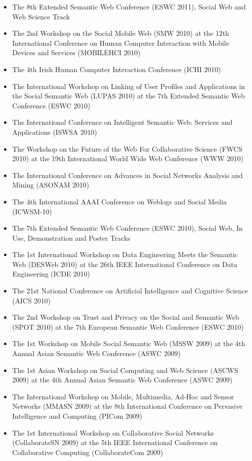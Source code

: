 \documentclass[10pt,a4paper]{res} %
\begin{document}
\begin{resume}
\begin{itemize}
\item The 8th Extended Semantic Web Conference (ESWC 2011), Social Web and Web Science Track
\item The 2nd Workshop on the Social Mobile Web (SMW 2010) at the 12th International Conference on Human Computer Interaction with Mobile Devices and Services (MOBILEHCI 2010)
\item The 4th Irish Human Computer Interaction Conference (ICHI 2010)
\item The International Workshop on Linking of User Profiles and Applications in the Social Semantic Web (LUPAS 2010) at the 7th Extended Semantic Web Conference (ESWC 2010)
\item The International Conference on Intelligent Semantic Web: Services and Applications (ISWSA 2010)
\item The Workshop on the Future of the Web For Collaborative Science (FWCS 2010) at the 19th International World Wide Web Conference (WWW 2010)
\item The International Conference on Advances in Social Networks Analysis and Mining (ASONAM 2010)
\item The 4th International AAAI Conference on Weblogs and Social Media (ICWSM-10)
\item The 7th Extended Semantic Web Conference (ESWC 2010), Social Web, In Use, Demonstration and Poster Tracks
\item The 1st International Workshop on Data Engineering Meets the Semantic Web (DESWeb 2010) at the 26th IEEE International Conference on Data Engineering (ICDE 2010)
\item The 21st National Conference on Artificial Intelligence and Cognitive Science (AICS 2010)
\item The 2nd Workshop on Trust and Privacy on the Social and Semantic Web (SPOT 2010) at the 7th European Semantic Web Conference (ESWC 2010)
\item The 1st Workshop on Mobile Social Semantic Web (MSSW 2009) at the 4th Annual Asian Semantic Web Conference (ASWC 2009)
\item The 1st Asian Workshop on Social Computing and Web Science (ASCWS 2009) at the 4th Annual Asian Semantic Web Conference (ASWC 2009)
\item The International Workshop on Mobile, Multimedia, Ad-Hoc and Sensor Networks (MMASN 2009) at the 8th International Conference on Pervasive Intelligence and Computing (PICom 2009)
\item The 1st International Workshop on Collaborative Social Networks (CollaborateSN 2009) at the 5th IEEE International Conference on Collaborative Computing (CollaborateCom 2009)

\end{itemize}
\end{resume}
\end{document}
